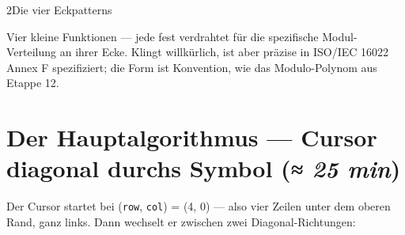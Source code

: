 \begin{pythoneinheit}{2}{Die vier Eckpatterns}

Vier kleine Funktionen — jede fest verdrahtet für die spezifische
Modul-Verteilung an ihrer Ecke. Klingt willkürlich, ist aber präzise
in ISO/IEC 16022 Annex F spezifiziert; die Form ist Konvention, wie
das Modulo-Polynom aus Etappe 12.
\end{pythoneinheit}

\section{Der Hauptalgorithmus — Cursor diagonal durchs Symbol \normalfont(\textit{≈ 25 min})}

Der Cursor startet bei (\texttt{row}, \texttt{col}) = (4, 0) — also
vier Zeilen unter dem oberen Rand, ganz links. Dann wechselt er
zwischen zwei Diagonal-Richtungen:

